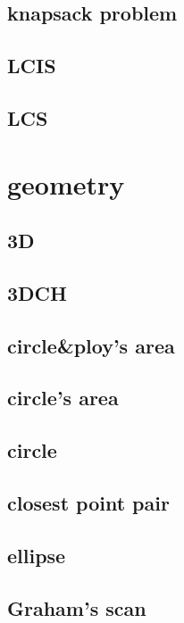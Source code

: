 \documentclass[a4paper,5pt,twocolumn,titlepage]{article}
\begin{document}
\subsection{knapsack problem}

\subsection{LCIS}

\subsection{LCS}

\section{geometry}
\subsection{3D}

\subsection{3DCH}

\subsection{circle\&ploy's area}

\subsection{circle's area}

\subsection{circle}

\subsection{closest point pair}

\subsection{ellipse}

\subsection{Graham's scan}

\end{document}
